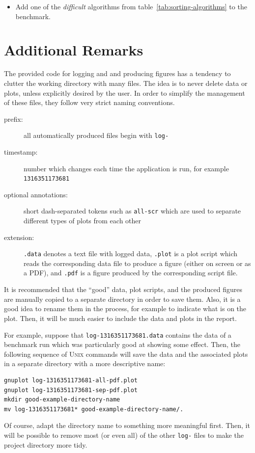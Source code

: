 \documentclass[a4paper,10pt]{article}
\begin{document}
\begin{itemize}
\item
  Add one of the \emph{difficult} algorithms from table~\ref{tab:sorting-algorithms} to the benchmark.
\end{itemize}



\section{Additional Remarks}\label{sec:remarks}

The provided code for logging and and producing figures has a tendency to clutter the working directory with many files.
The idea is to never delete data or plots, unless explicitly desired by the user.
In order to simplify the management of these files, they follow very strict naming conventions.

\begin{description}
\item[prefix:]
  all automatically produced files begin with \texttt{log-}
\item[timestamp:]
  number which changes each time the application is run, for example \texttt{1316351173681}
\item[optional annotations:]
  short dash-separated tokens such as \texttt{all-scr} which are used to separate different types of plots from each other
\item[extension:]
  \texttt{.data} denotes a text file with logged data, \texttt{.plot} is a plot script which reads the corresponding data file to produce a figure (either on screen or as a PDF), and \texttt{.pdf} is a figure produced by the corresponding script file.
\end{description}

It is recommended that the ``good'' data, plot scripts, and the produced figures are manually copied to a separate directory in order to save them.
Also, it is a good idea to rename them in the process, for example to indicate what is on the plot.
Then, it will be much easier to include the data and plots in the report.

For example, suppose that \texttt{log-1316351173681.data} contains the data of a benchmark run which was particularly good at showing some effect.
Then, the following sequence of \textsc{Unix} commands will save the data and the associated plots in a separate directory with a more descriptive name:

\begin{verbatim}
gnuplot log-1316351173681-all-pdf.plot
gnuplot log-1316351173681-sep-pdf.plot
mkdir good-example-directory-name
mv log-1316351173681* good-example-directory-name/.
\end{verbatim}

Of course, adapt the directory name to something more meaningful first.
Then, it will be possible to remove most (or even all) of the other \texttt{log-} files to make the project directory more tidy.
\end{document}
